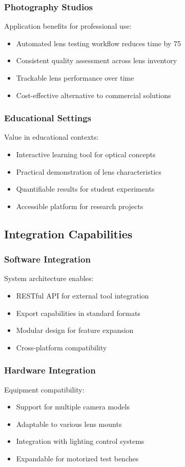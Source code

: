 \subsubsection{Photography Studios}
Application benefits for professional use:
\begin{itemize}
    \item Automated lens testing workflow reduces time by 75%
    \item Consistent quality assessment across lens inventory
    \item Trackable lens performance over time
    \item Cost-effective alternative to commercial solutions
\end{itemize}

\subsubsection{Educational Settings}
Value in educational contexts:
\begin{itemize}
    \item Interactive learning tool for optical concepts
    \item Practical demonstration of lens characteristics
    \item Quantifiable results for student experiments
    \item Accessible platform for research projects
\end{itemize}

\subsection{Integration Capabilities}

\subsubsection{Software Integration}
System architecture enables:
\begin{itemize}
    \item RESTful API for external tool integration
    \item Export capabilities in standard formats
    \item Modular design for feature expansion
    \item Cross-platform compatibility
\end{itemize}

\subsubsection{Hardware Integration}
Equipment compatibility:
\begin{itemize}
    \item Support for multiple camera models
    \item Adaptable to various lens mounts
    \item Integration with lighting control systems
    \item Expandable for motorized test benches
\end{itemize}

